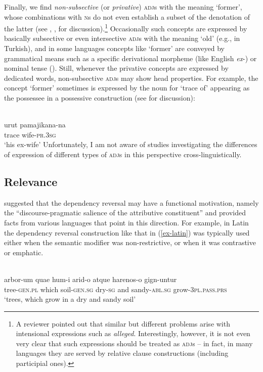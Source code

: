 \documentclass[output=paper
  ,nobabel
  ,draftmode
  ,colorlinks, citecolor=brown
]{langscibook}
\begin{document}
Finally, we find \emph{non-subsective} (or \emph{privative}) \textsc{adj}s with the meaning `former', whose combinations with
\textsc{n}s do not even establish a subset of the denotation of the latter (see \cite{Kamp1975}, \cite{KampPartee1995}, \cite{Partee2010} for discussion).\footnote{A reviewer pointed out that similar but different problems arise with intensional expressions such as \emph{alleged}. Interestingly, however, it is not even very clear that such expressions should be treated as \textsc{adj}s – in fact, in many languages they are served by relative clause constructions (including participial ones).} Occasionally such concepts are expressed by basically subsective or even intersective \textsc{adj}s with the meaning `old' (e.g., in Turkish), and in some languages concepts like `former' are conveyed by grammatical means such as a specific derivational morpheme (like English \emph{ex}-) or nominal tense (\cite{NordlingerSadler2004}). Still, whenever the privative concepts are expressed by dedicated words, non-subsective \textsc{adj}s may show head properties. For example, the concept `former' sometimes is expressed by the noun for `trace of' appearing as the possessee in a possessive construction (see \citealt{Lander2009} for discussion):

\ea 
{}\\
\gll urut 	pamajikana-na \\ 	
     trace	wife-\textsc{pr.3sg} \\
\glt `his ex-wife'
\z
Unfortunately, I am not aware of studies investigating the differences of expression of different types of \textsc{adj}s in this perspective cross-linguistically.

\subsection{Relevance}\label{sec-relevance}

\citet*[55]{Malchukov2000} suggested that the dependency reversal may have a functional motivation, namely the ``discourse-pragmatic salience of the attributive constituent'' and provided facts from various languages that point in this direction. For example, in Latin the dependency reversal construction like that in (\ref{ex-latin}) was typically used either when the semantic modifier was non-restrictive, or when it was contrastive or emphatic. 


\ea\label{ex-latin} 
\\
\gll  arbor-um	quae	hum-i		arid-o atque harenos-o	gign-untur \\ 
      tree-\textsc{gen.pl} which soil-\textsc{gen.sg}	dry-\textsc{sg}	and	sandy-\textsc{abl.sg} grow-\textsc{3pl.pass.prs} \\
\glt `trees, which grow in a dry and sandy soil'
\z
\end{document}
